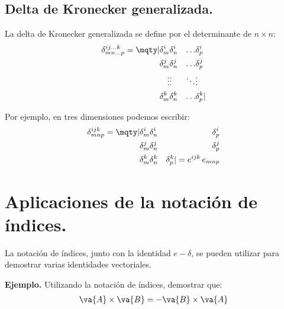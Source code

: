 \subsection*{Delta de Kronecker generalizada.}

La delta de Kronecker generalizada se define por el determinante de $n \times n$:
\begin{align*}
\delta_{m n \ldots p}^{i j \ldots k} = \mqty|
\delta_{m}^{i} & \delta_{n}^{i} & \ldots & \delta_{p}^{i} \\
\delta_{m}^{j} & \delta_{n}^{j} & \ldots & \delta_{p}^{j} \\
\vdots & \vdots & \ddots & \vdots \\
\delta_{m}^{k} & \delta_{n}^{k} & \ldots & \delta_{p}^{k} |
\end{align*}

Por ejemplo, en tres dimensiones podemos escribir:
\begin{align*}
\delta_{m n p}^{i j k} = \mqty|
\delta_{m}^{i} & \delta_{n}^{i} & \delta_{p}^{i} \\
\delta_{m}^{j} & \delta_{n}^{j} & \delta_{p}^{j} \\
\delta_{m}^{k} & \delta_{n}^{k} & \delta_{p}^{k}| =
e^{ijk} \, e_{mnp}
\end{align*}

\section{Aplicaciones de la notación de índices.}

La notación de índices, junto con la identidad $e-\delta$, se pueden utilizar para demostrar varias identidades vectoriales.
\par
\noindent
\textbf{Ejemplo.} Utilizando la notación de índices, demostrar que:
\begin{align*}
\va{A} \times \va{B} = - \va{B} \times \va{A}
\end{align*}

